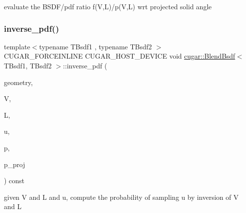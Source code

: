 evaluate the B\+S\+D\+F/pdf ratio f(\+V,\+L)/p(V,L) wrt projected solid angle \mbox{\label{structcugar_1_1_blend_bsdf_a5bfb9e04adb1ba5a5a2cebc49b137561}} 
\subsubsection{\texorpdfstring{inverse\+\_\+pdf()}{inverse\_pdf()}}
{\footnotesize\ttfamily template$<$typename T\+Bsdf1 , typename T\+Bsdf2 $>$ \\
C\+U\+G\+A\+R\+\_\+\+F\+O\+R\+C\+E\+I\+N\+L\+I\+NE C\+U\+G\+A\+R\+\_\+\+H\+O\+S\+T\+\_\+\+D\+E\+V\+I\+CE void \hyperlink{structcugar_1_1_blend_bsdf}{cugar\+::\+Blend\+Bsdf}$<$ T\+Bsdf1, T\+Bsdf2 $>$\+::inverse\+\_\+pdf (\begin{DoxyParamCaption}\item[{const \hyperlink{structcugar_1_1_differential_geometry}{Differential\+Geometry} \&}]{geometry,  }\item[{const \hyperlink{structcugar_1_1_vector}{Vector3f}}]{V,  }\item[{const \hyperlink{structcugar_1_1_vector}{Vector3f}}]{L,  }\item[{const \hyperlink{structcugar_1_1_vector}{Vector3f}}]{u,  }\item[{float \&}]{p,  }\item[{float \&}]{p\+\_\+proj }\end{DoxyParamCaption}) const\hspace{0.3cm}{\ttfamily [inline]}}

given V and L and u, compute the probability of sampling u by inversion of V and L \mbox{\label{structcugar_1_1_blend_bsdf_ae441aab40fa52f1223cd34cafede6a41}} 
